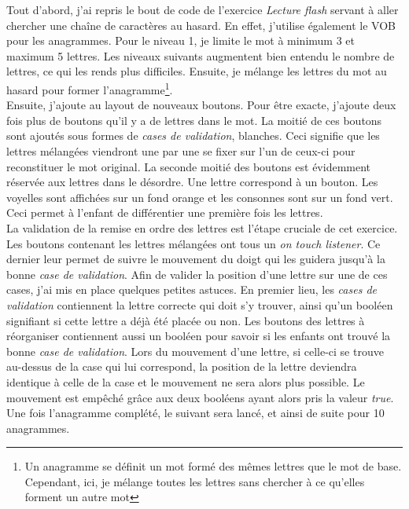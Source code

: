 Tout d'abord, j'ai repris le bout de code de l'exercice \textit{Lecture flash} servant à aller chercher une chaîne de caractères au hasard. En effet, j'utilise également le VOB pour les anagrammes. Pour le niveau 1, je limite le mot à minimum 3 et maximum 5 lettres. Les niveaux suivants augmentent bien entendu le nombre de lettres, ce qui les rends plus difficiles. Ensuite, je mélange les lettres du mot au hasard pour former l'anagramme\footnote{Un anagramme se définit un mot formé des mêmes lettres que le mot de base. Cependant, ici, je mélange toutes les lettres sans chercher à ce qu'elles forment un autre mot}.\\

Ensuite, j'ajoute au layout de nouveaux boutons. Pour être exacte, j'ajoute deux fois plus de boutons qu'il y a de lettres dans le mot. La moitié de ces boutons sont ajoutés sous formes de \textit{cases de validation}, blanches. Ceci signifie que les lettres mélangées viendront une par une se fixer sur l'un de ceux-ci pour reconstituer le mot original. La seconde moitié des boutons est évidemment réservée aux lettres dans le désordre. Une lettre correspond à un bouton. Les voyelles sont affichées sur un fond orange et les consonnes sont sur un fond vert. Ceci permet à l'enfant de différentier une première fois les lettres.\\

La validation de la remise en ordre des lettres est l'étape cruciale de cet exercice. Les boutons contenant les lettres mélangées ont tous un \textit{on touch listener}. Ce dernier leur permet de suivre le mouvement du doigt qui les guidera jusqu'à la bonne \textit{case de validation}. Afin de valider la position d'une lettre sur une de ces cases, j'ai mis en place quelques petites astuces. En premier lieu, les \textit{cases de validation} contiennent la lettre correcte qui doit s'y trouver, ainsi qu'un booléen signifiant si cette lettre a déjà été placée ou non. Les boutons des lettres à réorganiser contiennent aussi un booléen pour savoir si les enfants ont trouvé la bonne \textit{case de validation}. Lors du mouvement d'une lettre, si celle-ci se trouve au-dessus de la case qui lui correspond, la position de la lettre deviendra identique à celle de la case et le mouvement ne sera alors plus possible. Le mouvement est empêché grâce aux deux booléens ayant alors pris la valeur \textit{true}. Une fois l'anagramme complété, le suivant sera lancé, et ainsi de suite pour 10 anagrammes.\\

